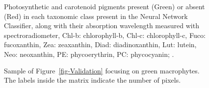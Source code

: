 \documentclass[
  number]{elsarticle}
\begin{document}
\label{cell-fig-Pigm}
\begin{figure}[H]


\caption{\label{fig-Pigm}Photosynthetic and carotenoid pigments present
(Green) or absent (Red) in each taxonomic class present in the Neural
Network Classifier, along with their absorption wavelength measured with
spectroradiometer, Chl-b: chlorophyll-b, Chl-c: chlorophyll-c, Fuco:
fucoxanthin, Zea: zeaxanthin, Diad: diadinoxanthin, Lut: lutein, Neo:
neoxanthin, PE: phycoerythrin, PC: phycocyanin;
\citep{ralph2002, Douay2022, christensen1977seaweeds, cartaxana2016regulation, meleder2013vivo}.}

\end{figure}%

\label{cell-fig-ValidationGreen}
\begin{figure}[H]


\caption{\label{fig-ValidationGreen}Sample of
Figure~\ref{fig-Validation} focusing on green macrophytes. The labels
inside the matrix indicate the number of pixels.}

\end{figure}%
\end{document}
